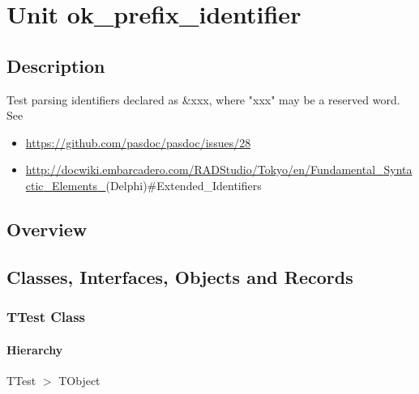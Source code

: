 \documentclass{report}
\newif\ifpdf
\begin{document}
\label{toc}\tableofcontents
\newpage
\newlength{\tmplength}
\chapter{Unit ok{\_}prefix{\_}identifier}
\label{ok_prefix_identifier}
\section{Description}
Test parsing identifiers declared as {\&}xxx, where "xxx" may be a reserved word. See \begin{itemize}
\item \href{https://github.com/pasdoc/pasdoc/issues/28}{https://github.com/pasdoc/pasdoc/issues/28}
\item \href{http://docwiki.embarcadero.com/RADStudio/Tokyo/en/Fundamental_Syntactic_Elements_}{http://docwiki.embarcadero.com/RADStudio/Tokyo/en/Fundamental{\_}Syntactic{\_}Elements{\_}}(Delphi){\#}Extended{\_}Identifiers
\end{itemize}
\section{Overview}
\begin{description}
\item[\texttt{\begin{ttfamily}TTest\end{ttfamily} Class}]
\end{description}
\section{Classes, Interfaces, Objects and Records}
\ifpdf
\subsection*{\large{\textbf{TTest Class}}\normalsize\hspace{1ex}\hrulefill}
\else
\subsection*{TTest Class}
\fi
\label{ok_prefix_identifier.TTest}
\subsubsection*{\large{\textbf{Hierarchy}}\normalsize\hspace{1ex}\hfill}
TTest {$>$} TObject
\end{document}
